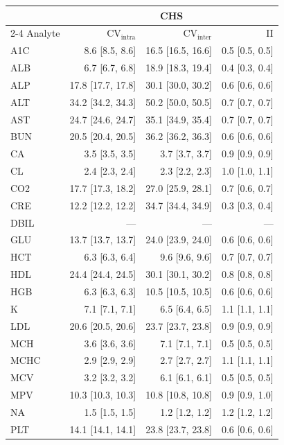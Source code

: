\begin{table}[ht]
\centering
\tiny
\begin{tabular}{lrrr}
\toprule
  & \multicolumn{3}{c}{CHS} \\
\cmidrule(lr){2-4}
Analyte & CV$_{\text{intra}}$ & CV$_{\text{inter}}$ & II \\
\midrule
A1C & 8.6 [8.5, 8.6] & 16.5 [16.5, 16.6] & 0.5 [0.5, 0.5] \\
ALB & 6.7 [6.7, 6.8] & 18.9 [18.3, 19.4] & 0.4 [0.3, 0.4] \\
ALP & 17.8 [17.7, 17.8] & 30.1 [30.0, 30.2] & 0.6 [0.6, 0.6] \\
ALT & 34.2 [34.2, 34.3] & 50.2 [50.0, 50.5] & 0.7 [0.7, 0.7] \\
AST & 24.7 [24.6, 24.7] & 35.1 [34.9, 35.4] & 0.7 [0.7, 0.7] \\
BUN & 20.5 [20.4, 20.5] & 36.2 [36.2, 36.3] & 0.6 [0.6, 0.6] \\
CA & 3.5 [3.5, 3.5] & 3.7 [3.7, 3.7] & 0.9 [0.9, 0.9] \\
CL & 2.4 [2.3, 2.4] & 2.3 [2.2, 2.3] & 1.0 [1.0, 1.1] \\
CO2 & 17.7 [17.3, 18.2] & 27.0 [25.9, 28.1] & 0.7 [0.6, 0.7] \\
CRE & 12.2 [12.2, 12.2] & 34.7 [34.4, 34.9] & 0.3 [0.3, 0.4] \\
DBIL & --- & --- & --- \\
GLU & 13.7 [13.7, 13.7] & 24.0 [23.9, 24.0] & 0.6 [0.6, 0.6] \\
HCT & 6.3 [6.3, 6.4] & 9.6 [9.6, 9.6] & 0.7 [0.7, 0.7] \\
HDL & 24.4 [24.4, 24.5] & 30.1 [30.1, 30.2] & 0.8 [0.8, 0.8] \\
HGB & 6.3 [6.3, 6.3] & 10.5 [10.5, 10.5] & 0.6 [0.6, 0.6] \\
K & 7.1 [7.1, 7.1] & 6.5 [6.4, 6.5] & 1.1 [1.1, 1.1] \\
LDL & 20.6 [20.5, 20.6] & 23.7 [23.7, 23.8] & 0.9 [0.9, 0.9] \\
MCH & 3.6 [3.6, 3.6] & 7.1 [7.1, 7.1] & 0.5 [0.5, 0.5] \\
MCHC & 2.9 [2.9, 2.9] & 2.7 [2.7, 2.7] & 1.1 [1.1, 1.1] \\
MCV & 3.2 [3.2, 3.2] & 6.1 [6.1, 6.1] & 0.5 [0.5, 0.5] \\
MPV & 10.3 [10.3, 10.3] & 10.8 [10.8, 10.8] & 0.9 [0.9, 1.0] \\
NA & 1.5 [1.5, 1.5] & 1.2 [1.2, 1.2] & 1.2 [1.2, 1.2] \\
PLT & 14.1 [14.1, 14.1] & 23.8 [23.7, 23.8] & 0.6 [0.6, 0.6] \\

\end{tabular}
\end{table}
